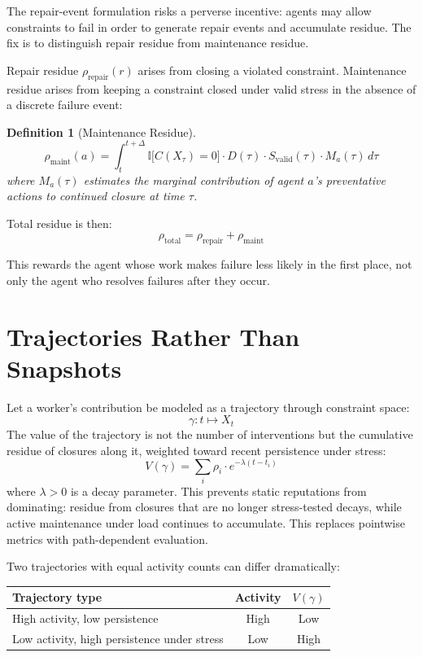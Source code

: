 \documentclass[12pt]{article}
\newtheorem{definition}{Definition}
\begin{document}
The repair-event formulation risks a perverse incentive: agents may
allow constraints to fail in order to generate repair events and
accumulate residue. The fix is to distinguish repair residue from
maintenance residue.

Repair residue $\rho_{\mathrm{repair}}(r)$ arises from closing a
violated constraint. Maintenance residue arises from keeping a
constraint closed under valid stress in the absence of a discrete
failure event:

\begin{definition}[Maintenance Residue]
\[
  \rho_{\mathrm{maint}}(a) =
    \int_{t}^{t+\Delta}
      \mathbb{I}\bigl[C(X_\tau) = 0\bigr]
      \cdot D(\tau)
      \cdot S_{\mathrm{valid}}(\tau)
      \cdot M_a(\tau)
    \, d\tau
\]
where $M_a(\tau)$ estimates the marginal contribution of agent $a$'s
preventative actions to continued closure at time $\tau$.
\end{definition}

Total residue is then:
\[
  \rho_{\mathrm{total}} = \rho_{\mathrm{repair}} + \rho_{\mathrm{maint}}
\]

This rewards the agent whose work makes failure less likely in the first
place, not only the agent who resolves failures after they occur.

\section{Trajectories Rather Than Snapshots}

Let a worker's contribution be modeled as a trajectory through
constraint space:
\[
  \gamma : t \mapsto X_t
\]
The value of the trajectory is not the number of interventions but the
cumulative residue of closures along it, weighted toward recent
persistence under stress:
\[
  V(\gamma) = \sum_i \rho_i \cdot e^{-\lambda(t - t_i)}
\]
where $\lambda > 0$ is a decay parameter. This prevents static
reputations from dominating: residue from closures that are no longer
stress-tested decays, while active maintenance under load continues to
accumulate. This replaces pointwise metrics with path-dependent
evaluation.

Two trajectories with equal activity counts can differ dramatically:

\medskip
\begin{center}
\begin{tabular}{lcc}
\toprule
Trajectory type & Activity & $V(\gamma)$ \\
\midrule
High activity, low persistence & High & Low \\
Low activity, high persistence under stress & Low & High \\
\bottomrule
\end{tabular}
\end{center}
\medskip
\end{document}
